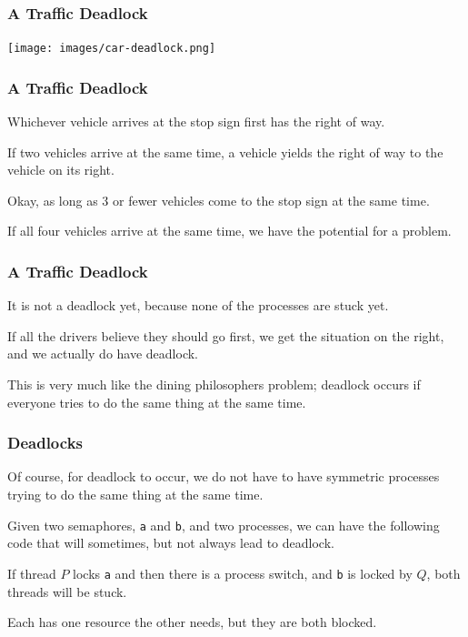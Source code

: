 \begin{frame}
	\frametitle{A Traffic Deadlock}

	\begin{center}
		\texttt{[image: images/car-deadlock.png]}
	\end{center}


\end{frame}

\begin{frame}
	\frametitle{A Traffic Deadlock}

	Whichever vehicle arrives at the stop sign first has the right of way.

	If two vehicles arrive at the same time, a vehicle yields the right of way to the vehicle on its right.

	Okay, as long as 3 or fewer vehicles come to the stop sign at the same time.

	If all four vehicles arrive at the same time, we have the potential for a problem.
\end{frame}

\begin{frame}
	\frametitle{A Traffic Deadlock}

	It is not a deadlock yet, because none of the processes are stuck yet.

	If all the drivers believe they should go first, we get the situation on the right, and we actually do have deadlock.

	This is very much like the dining philosophers problem; deadlock occurs if everyone tries to do the same thing at the same time.

\end{frame}

\begin{frame}
	\frametitle{Deadlocks}

	Of course, for deadlock to occur, we do not have to have symmetric processes trying to do the same thing at the same time.

	Given two semaphores, \texttt{a} and \texttt{b}, and two processes, we can have the following code that will sometimes, but not always lead to deadlock.

	If thread $P$ locks \texttt{a} and then there is a process switch, and \texttt{b} is locked by $Q$, both threads will be stuck.

	Each has one resource the other needs, but they are both blocked.


\end{frame}

